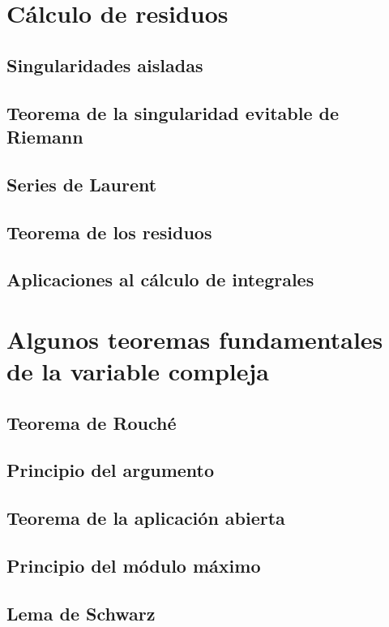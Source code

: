 \documentclass{apuntes}
\begin{document}

\chapter{Cálculo de residuos}
\section{Singularidades aisladas}
\section{Teorema de la singularidad evitable de Riemann}
\section{Series de Laurent}
\section{Teorema de los residuos}
\section{Aplicaciones al cálculo de integrales}


\chapter{Algunos teoremas fundamentales de la variable compleja}
\section{Teorema de Rouché}
\section{Principio del argumento}
\section{Teorema de la aplicación abierta}
\section{Principio del módulo máximo}
\section{Lema de Schwarz}
\end{document}
